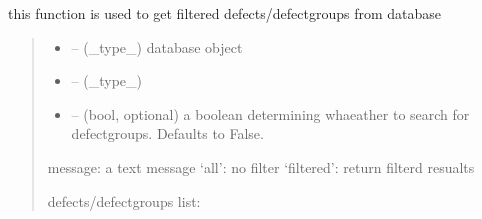 \documentclass[letterpaper,10pt,english]{sphinxmanual}
\begin{document}
\begin{savenotes}\begin{fulllineitems}
\label{\detokenize{setting/backend/defect_management_funcs:oxin.backend.defect_management_funcs.get_filtered_defects_from_db}}
\pysigstartsignatures
{}
\pysigstopsignatures
\sphinxAtStartPar
this function is used to get filtered defects/defect\sphinxhyphen{}groups from database
\begin{quote}\begin{description}
\begin{itemize}
\item {} 
\sphinxAtStartPar
{} – (\_type\_) database object

\item {} 
\sphinxAtStartPar
{} – (\_type\_)

\item {} 
\sphinxAtStartPar
{} – (bool, optional) a boolean determining whaeather to search for defect\sphinxhyphen{}groups. Defaults to False.

\end{itemize}

\sphinxAtStartPar
message: a text message
‘all’: no filter
‘filtered’: return filterd resualts

\sphinxAtStartPar
defects/defect\sphinxhyphen{}groups list:

\end{description}\end{quote}

\end{fulllineitems}\end{savenotes}

\end{document}
